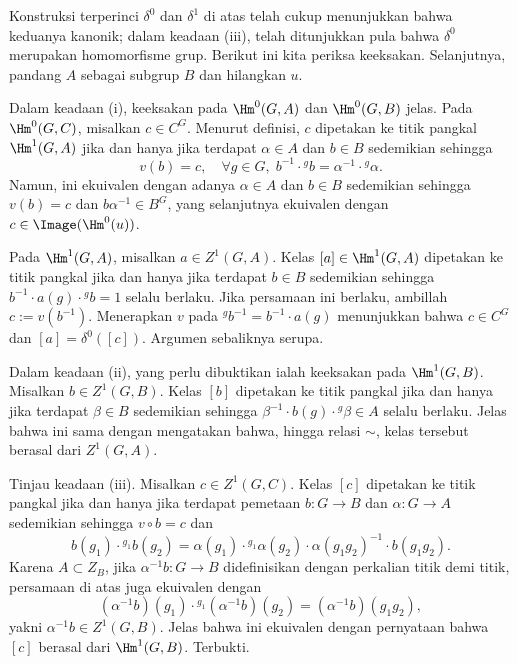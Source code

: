 \begin{bukti}
	Konstruksi terperinci $\delta^0$ dan $\delta^1$ di atas telah cukup
	menunjukkan bahwa keduanya kanonik; dalam keadaan (iii), telah ditunjukkan
	pula bahwa $\delta^0$ merupakan homomorfisme grup. Berikut ini kita
	periksa keeksakan. Selanjutnya, pandang $A$ sebagai subgrup $B$ dan
	hilangkan $u$.
	
	Dalam keadaan (i), keeksakan pada $\Hm^0(G,A)$ dan $\Hm^0(G,B)$ jelas.
	Pada $\Hm^0(G,C)$, misalkan $c\in C^G$. Menurut definisi, $c$ dipetakan ke
	titik pangkal $\Hm^1(G,A)$ jika dan hanya jika terdapat $\alpha\in A$ dan
	$b\in B$ sedemikian sehingga
	\[ v(b) = c, \quad \forall g \in G,\; b^{-1} \cdot {}^g b = \alpha^{-1} \cdot {}^g \alpha. \]
	Namun, ini ekuivalen dengan adanya $\alpha\in A$ dan $b\in B$ sedemikian
	sehingga $v(b)=c$ dan $b\alpha^{-1}\in B^G$, yang selanjutnya ekuivalen
	dengan $c\in\Image(\Hm^0(u))$.
	
	Pada $\Hm^1(G,A)$, misalkan $a\in Z^1(G,A)$. Kelas
	$[a]\in\Hm^1(G,A)$ dipetakan ke titik pangkal jika dan hanya jika terdapat
	$b\in B$ sedemikian sehingga
	$b^{-1}\cdot a(g)\cdot{}^gb=1$ selalu berlaku. Jika persamaan ini berlaku,
	ambillah $c:=v(b^{-1})$. Menerapkan $v$ pada
	${}^gb^{-1}=b^{-1}\cdot a(g)$ menunjukkan bahwa $c\in C^G$ dan
	$[a]=\delta^0([c])$. Argumen sebaliknya serupa.
	
	Dalam keadaan (ii), yang perlu dibuktikan ialah keeksakan pada
	$\Hm^1(G,B)$. Misalkan $b\in Z^1(G,B)$. Kelas $[b]$ dipetakan ke titik
	pangkal jika dan hanya jika terdapat $\beta\in B$ sedemikian sehingga
	$\beta^{-1}\cdot b(g)\cdot{}^g\beta\in A$ selalu berlaku. Jelas bahwa ini
	sama dengan mengatakan bahwa, hingga relasi $\sim$, kelas tersebut berasal
	dari $Z^1(G,A)$.
	
	Tinjau keadaan (iii). Misalkan $c\in Z^1(G,C)$. Kelas $[c]$ dipetakan ke
	titik pangkal jika dan hanya jika terdapat pemetaan $b:G\to B$ dan
	$\alpha:G\to A$ sedemikian sehingga $v\circ b=c$ dan
	\[ b(g_1) \cdot {}^{g_1} b(g_2) = \alpha(g_1) \cdot {}^{g_1} \alpha(g_2) \cdot \alpha(g_1 g_2)^{-1} \cdot  b(g_1 g_2). \]
	Karena $A\subset Z_B$, jika $\alpha^{-1}b:G\to B$ didefinisikan dengan
	perkalian titik demi titik, persamaan di atas juga ekuivalen dengan
	\[ (\alpha^{-1} b)(g_1) \cdot {}^{g_1} (\alpha^{-1} b)(g_2) = (\alpha^{-1} b)(g_1 g_2), \]
	yakni $\alpha^{-1}b\in Z^1(G,B)$. Jelas bahwa ini ekuivalen dengan
	pernyataan bahwa $[c]$ berasal dari $\Hm^1(G,B)$. Terbukti.
\end{bukti}

